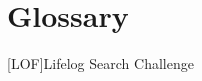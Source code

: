 \chapter{Glossary}

\footnotesize
\SingleSpacing

\begin{multicols}{2}
\begin{acronym}[AAAAAA]

    [LOF]{Lifelog Search Challenge}
   
\end{acronym}
\end{multicols}

